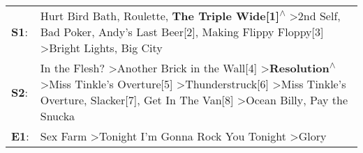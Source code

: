 \begin{supertabular}{p{0.03\textwidth}p{0.92\textwidth}}
 \textbf{S1}:  &                                                                                                                                                        Hurt Bird Bath\textsuperscript{}, \enspace Roulette\textsuperscript{}, \enspace \textbf{The Triple Wide[1]\textsuperscript{$\wedge$}} \textgreater \enspace 2nd Self\textsuperscript{}, \enspace Bad Poker\textsuperscript{}, \enspace Andy's Last Beer[2]\textsuperscript{}, \enspace Making Flippy Floppy[3]\textsuperscript{} \textgreater \enspace Bright Lights, Big City\textsuperscript{}  \enspace  \\
 \textbf{S2}:  &  In the Flesh?\textsuperscript{} \textgreater \enspace Another Brick in the Wall[4]\textsuperscript{} \textgreater \enspace \textbf{Resolution\textsuperscript{$\wedge$}} \textgreater \enspace Miss Tinkle's Overture[5]\textsuperscript{} \textgreater \enspace Thunderstruck[6]\textsuperscript{} \textgreater \enspace Miss Tinkle's Overture\textsuperscript{}, \enspace Slacker[7]\textsuperscript{}, \enspace Get In The Van[8]\textsuperscript{} \textgreater \enspace Ocean Billy\textsuperscript{}, \enspace Pay the Snucka\textsuperscript{}  \enspace  \\
 \textbf{E1}:  &                                                                                                                                                                                                                                                                                                                                                                                                     Sex Farm\textsuperscript{} \textgreater \enspace Tonight I'm Gonna Rock You Tonight\textsuperscript{} \textgreater \enspace Glory\textsuperscript{}  \enspace  \\
\end{supertabular}
